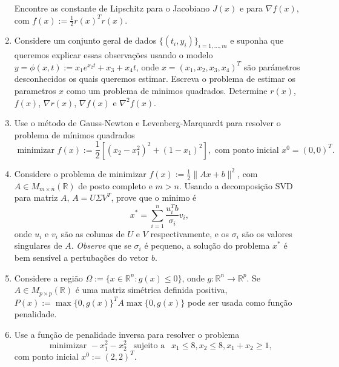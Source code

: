 \documentclass[a4paper,latin]{article}
\begin{document}
\begin{enumerate}
    Encontre as constante de Lipschitz para o Jacobiano $J(x)$ e para $\nabla f(x)$, com $f(x):=\frac{1}{2}r(x)^{T}r(x)$. 
     \item Considere um conjunto geral de dados $\{(t_i,y_{i})\}_{i=1,\dots,m}$ e suponha que queremos explicar essas observações usando o modelo
     $y=\phi(x,t):=x_1e^{x_2t}+x_3+x_4t$, onde $x=(x_1,x_2,x_3,x_4)^{T}$ são parámetros desconhecidos os quais queremos estimar.  
     Escreva o problema de estimar os parametros $x$ como um problema de minimos quadrados. Determine $r(x)$, $f(x)$, 
     $\nabla r(x)$, $\nabla f(x)$ e $\nabla^{2} f(x)$. 
    \item Use o método de Gauss-Newton e Levenberg-Marquardt para resolver o problema de mínimos quadrados 
    $$ \text{ minimizar }
    f(x):=
    \frac{1}{2}
    [(x_2-x_{1}^2)^{2}+(1-x_1)^2], \text{ com ponto inicial }
    x^{0}=(0,0)^{T}. $$  
     \item Considere o problema de minimizar 
    $f(x):=\frac{1}{2}\|Ax+b\|^{2}$, com $A \in M_{m \times n}(\mathbb{R})$ de posto completo e $m>n$.
    Usando a decomposição SVD para matriz $A$,  $A=U\Sigma V^{T}$, prove que o minimo é  
    $$  x^*= \sum_{i=1}^{n} \frac{u_{i}^{T}b}{\sigma_i} v_i, $$
    onde $u_{i}$ e $v_{i}$ são as colunas de $U$ e $V$ respectivamente, 
    e os $\sigma_i$ são os valores singulares de $A$.
    {\it Observe} que se $\sigma_i$ é pequeno, a solução do problema $x^*$ é bem sensível a pertubações do vetor $b$. 
    \item  Considere a região 
    $\Omega:=
    \{x \in \mathbb{R}^{n}:
    g(x)\leq 0\}$, onde 
    $g:\mathbb{R}^{n}\rightarrow \mathbb{R}^{p}$.    
    Se $A \in M_{p \times p}(\mathbb{R})$
    é uma matriz simétrica definida positiva, 
    $P(x):=\max\{0,g(x)\}^{T}A \max\{0,g(x)\}$
    pode ser usada como função penalidade.
    \item Use a função de penalidade inversa para resolver o problema 
     $$ \text{ minimizar }
    -x_1^2-x_2^2 
        \  \ \text{ sujeito a }  \ \
    x_1\leq 8, x_2 \leq 8, x_1+x_2 \geq 1,  $$
    com ponto inicial 
    $x^{0}:=(2,2)^{T}$. 
    

\end{enumerate}
\end{document}

